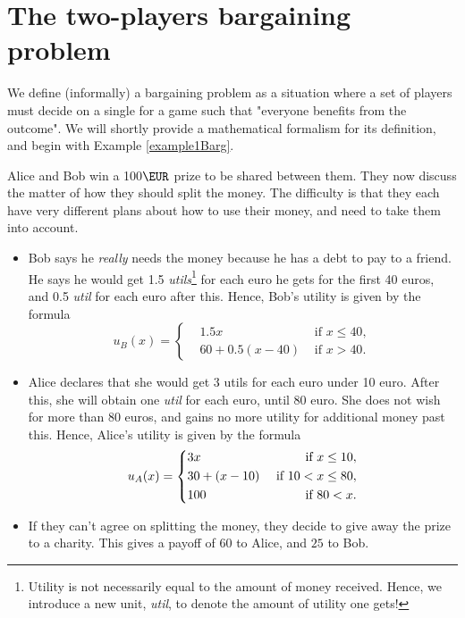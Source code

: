 \section{The two-players bargaining problem}
\label{sec2PBarg}


We define (informally) a bargaining problem as a situation where a set of players must decide on a single for a game such that "everyone benefits from the outcome". We will shortly provide a mathematical formalism for its definition, and begin with Example \ref{example1Barg}.

\begin{example}
\label{example1Barg}
Alice and Bob win a 100$\EUR$ prize to be shared between them.
They now discuss the matter of how they should split the money. The difficulty is that they each have very different plans about how to use their money, and need to take them into account.
\begin{itemize}
\item Bob says he \emph{really} needs the money because he has a debt to pay to a friend.
He says he would get 1.5 \emph{utils}\footnote{Utility is not necessarily equal to the amount of money received. Hence, we introduce a new unit, \emph{util}, to denote the amount of utility one gets!} for each euro he gets for the first 40 euros, and 0.5 \emph{util} for each euro after this.
Hence, Bob's utility is given by the formula
$$u_B(x) = \left \{ \begin{aligned}
& 1.5x & \text{ if $x \leq 40$}, \\
& 60 + 0.5(x - 40) & \text{ if $x > 40$}.
\end{aligned} \right . $$
\item Alice declares that she would get 3 utils for each euro under 10 euro.
After this, she will obtain one \emph{util} for each euro, until 80 euro. She does not wish for more than 80 euros, and gains no more utility for additional money past this.
Hence, Alice's utility is given by the formula
$$u_A(x) = \left \{ \begin{aligned}
& 3x & \text{ if $x \leq 10$}, \\
& 30 + (x - 10) & \text{ if $ 10 < x \leq 80$}, \\
& 100  & \text{ if $80 < x $}.
\end{aligned} \right . $$
\item If they can't agree on splitting the money, they decide to give away the prize to a charity. This gives a payoff of $60$ to Alice, and $25$ to Bob.
\end{itemize}

\end{example}
